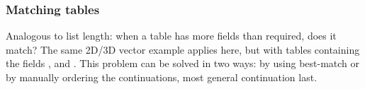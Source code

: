 \subsubsection{Matching tables}
Analogous to list length: when a table has more fields than required, does it match? The same 2D/3D vector example applies here, but with tables containing the fields ,  and .
This problem can be solved in two ways: by using best-match or by manually ordering the continuations, most general continuation last.
